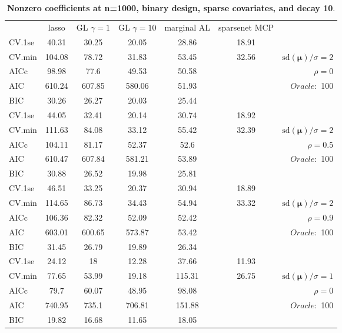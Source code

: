\clearpage
\begin{table}\vspace{-.5cm}
\caption[l]{ { \bf Nonzero coefficients at n=1000, binary design, 
sparse covariates, and  decay  10}.}
\vspace{-.5cm}
\footnotesize{}
\begin{center}
\begin{tabular}{l*{5}{c}|r}
& lasso & GL $\gamma=1$ & GL $\gamma=10$ & marginal AL & sparsenet MCP  & \\
 \cline{1-7}
CV.1se & 40.31 & 30.25 & 20.05 & 28.86 & 18.91 & \\
CV.min & 104.08 & 78.72 & 31.83 & 53.45 & 32.56 &  $\mathrm{sd}(\mathbf{\mu})/\sigma=2$ \\
AICc & 98.98 & 77.6 & 49.53 & 50.58 & & $\rho=0$ \\
AIC & 610.24 & 607.85 & 580.06 & 51.93 & &  \multirow{2}{*}{$Oracle: $ 100} \\
BIC & 30.26 & 26.27 & 20.03 & 25.44 & &  \\
 \hline 
CV.1se & 44.05 & 32.41 & 20.14 & 30.74 & 18.92 & \\
CV.min & 111.63 & 84.08 & 33.12 & 55.42 & 32.39 &  $\mathrm{sd}(\mathbf{\mu})/\sigma=2$ \\
AICc & 104.11 & 81.17 & 52.37 & 52.6 & & $\rho=0.5$ \\
AIC & 610.47 & 607.84 & 581.21 & 53.89 & &  \multirow{2}{*}{$Oracle: $ 100} \\
BIC & 30.88 & 26.52 & 19.98 & 25.81 & &  \\
 \hline 
CV.1se & 46.51 & 33.25 & 20.37 & 30.94 & 18.89 & \\
CV.min & 114.65 & 86.73 & 34.43 & 54.94 & 33.32 &  $\mathrm{sd}(\mathbf{\mu})/\sigma=2$ \\
AICc & 106.36 & 82.32 & 52.09 & 52.42 & & $\rho=0.9$ \\
AIC & 603.01 & 600.65 & 573.87 & 53.42 & &  \multirow{2}{*}{$Oracle: $ 100} \\
BIC & 31.45 & 26.79 & 19.89 & 26.34 & &  \\
 \hline 
CV.1se & 24.12 & 18 & 12.28 & 37.66 & 11.93 & \\
CV.min & 77.65 & 53.99 & 19.18 & 115.31 & 26.75 &  $\mathrm{sd}(\mathbf{\mu})/\sigma=1$ \\
AICc & 79.7 & 60.07 & 48.95 & 98.08 & & $\rho=0$ \\
AIC & 740.95 & 735.1 & 706.81 & 151.88 & &  \multirow{2}{*}{$Oracle: $ 100} \\
BIC & 19.82 & 16.68 & 11.65 & 18.05 & &  \\

\end{tabular}
\end{center}
\end{table}
